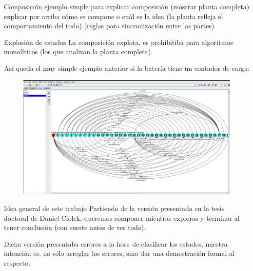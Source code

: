 \begin{frame}{Composición} 
    ejemplo simple para explicar composición (mostrar planta completa)
    explicar por arriba cómo se compone o cuál es la idea (la planta refleja el comportamiento del todo) (reglas para sincronización entre las partes)
\end{frame}
\begin{frame}{Explosión de estados}
    La composición explota, es prohibitiba para algoritmos monolíticos (los que analizan la planta completa).
    
    Así queda el muy simple ejemplo anterior si la batería tiene un contador de carga:
    \begin{figure}
    	\includegraphics[width=\textwidth]{figures/big-plant.png}
    \end{figure}
\end{frame}
\begin{frame}{Idea general de este trabajo}
    Partiendo de la versión presentada en la tesis doctoral de Daniel Ciolek, queremos componer mientras exploras y terminar al tener conclusión (con suerte antes de ver todo).
    
    Dicha versión presentaba errores a la hora de clasificar los estados, nuestra intención es, no sólo arreglar los errores, sino dar una demostración formal al respecto.
    
\end{frame}
